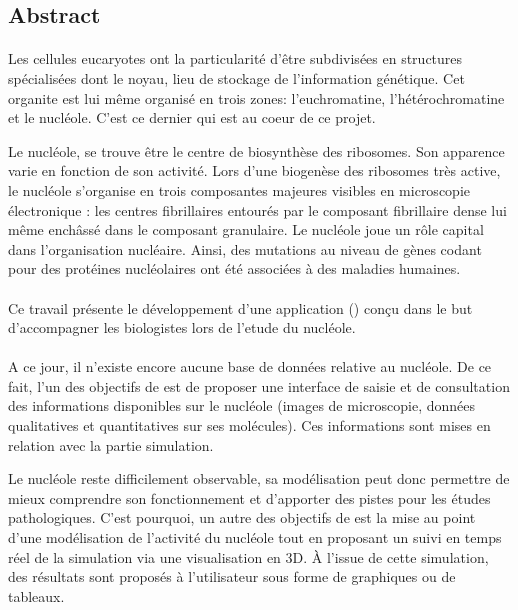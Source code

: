 \begin{center}\section*{Abstract}\end{center}

\paragraph{}
Les cellules eucaryotes ont la particularité d'être subdivisées en
structures spécialisées dont le noyau, lieu de stockage de
l'information génétique.  Cet organite est lui même organisé en trois
zones: l'euchromatine, l'hétérochromatine et le nucléole.  C'est ce
dernier qui est au coeur de ce projet.

Le nucléole, se trouve être le centre de biosynthèse des ribosomes.
Son apparence varie en fonction de son activité.  Lors d'une biogenèse
des ribosomes très active, le nucléole s'organise en trois composantes
majeures visibles en microscopie électronique : les centres
fibrillaires entourés par le composant fibrillaire dense lui même
enchâssé dans le composant granulaire. Le nucléole joue un rôle
capital dans l’organisation nucléaire. Ainsi, des mutations au niveau
de gènes codant pour des protéines nucléolaires ont été associées à
des maladies humaines.

\paragraph{}
Ce travail présente le développement d'une application (\NQ) conçu
dans le but d'accompagner les biologistes lors de l'etude du nucléole.

\paragraph{}
A ce jour, il n'existe encore aucune base de données relative au
nucléole. De ce fait, l'un des objectifs de \NQ est de proposer une
interface de saisie et de consultation des informations disponibles
sur le nucléole (images de microscopie, données qualitatives et
quantitatives sur ses molécules). Ces informations sont mises en
relation avec la partie simulation.

Le nucléole reste difficilement observable, sa modélisation peut donc
permettre de mieux comprendre son fonctionnement et d'apporter des
pistes pour les études pathologiques. C'est pourquoi, un autre des
objectifs de \NQ est la mise au point d'une modélisation de l'activité
du nucléole tout en proposant un suivi en temps réel de la simulation
via une visualisation en 3D. À l'issue de cette simulation, des
résultats sont proposés à l'utilisateur sous forme de graphiques ou de
tableaux.

